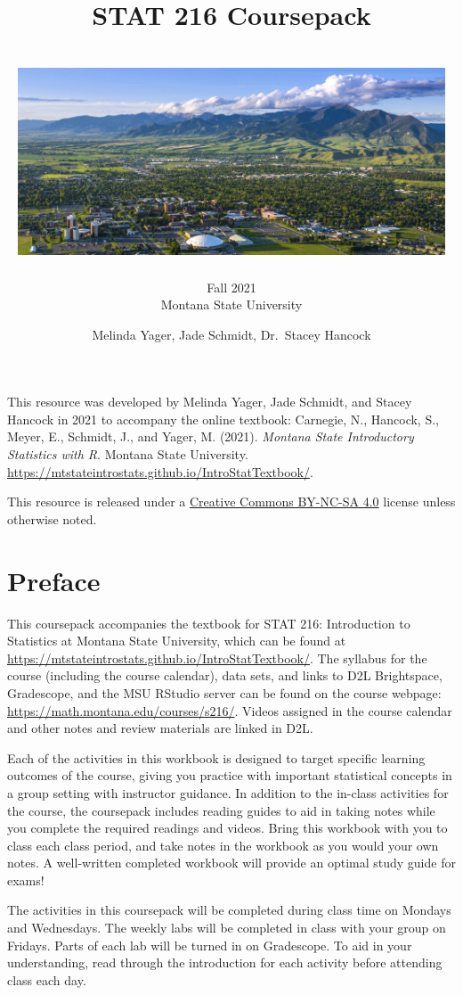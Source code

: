 \documentclass[
]{report}
\title{\textbf{STAT 216 Coursepack}\\
~\\
\includegraphics[width=5in,height=\textheight]{images/msu-campus.jpg}}
\subtitle{Fall 2021\\
Montana State University}
\author{Melinda Yager, Jade Schmidt, Dr.~Stacey Hancock}
\date{}
\begin{document}
\maketitle

\newpage
\thispagestyle{empty}

This resource was developed by Melinda Yager, Jade Schmidt, and Stacey Hancock in 2021 to accompany the online textbook: Carnegie, N., Hancock, S., Meyer, E., Schmidt, J., and Yager, M. (2021). \emph{Montana State Introductory Statistics with R}. Montana State University. \url{https://mtstateintrostats.github.io/IntroStatTextbook/}.

This resource is released under a \href{https://creativecommons.org/licenses/by-nc-sa/4.0/}{Creative Commons BY-NC-SA 4.0} license unless otherwise noted.

\setcounter{tocdepth}{1}
\tableofcontents
\thispagestyle{empty}

\newpage
\setcounter{page}{1}

\hypertarget{preface}{%
\chapter*{Preface}\label{preface}}

This coursepack accompanies the textbook for STAT 216: Introduction to Statistics at Montana State University, which can be found at \url{https://mtstateintrostats.github.io/IntroStatTextbook/}. The syllabus for the course (including the course calendar), data sets, and links to D2L Brightspace, Gradescope, and the MSU RStudio server can be found on the course webpage: \url{https://math.montana.edu/courses/s216/}.
Videos assigned in the course calendar and other notes and review materials are linked in D2L.

Each of the activities in this workbook is designed to target specific learning outcomes of the course, giving you practice with important statistical concepts in a group setting with instructor guidance. In addition to the in-class activities for the course, the coursepack includes reading guides to aid in taking notes while you complete the required readings and videos. Bring this workbook with you to class each class period, and take notes in the workbook as you would your own notes. A well-written completed workbook will provide an optimal study guide for exams!

The activities in this coursepack will be completed during class time on Mondays and Wednesdays. The weekly labs will be completed in class with your group on Fridays. Parts of each lab will be turned in on Gradescope. To aid in your understanding, read through the introduction for each activity before attending class each day.
\end{document}
